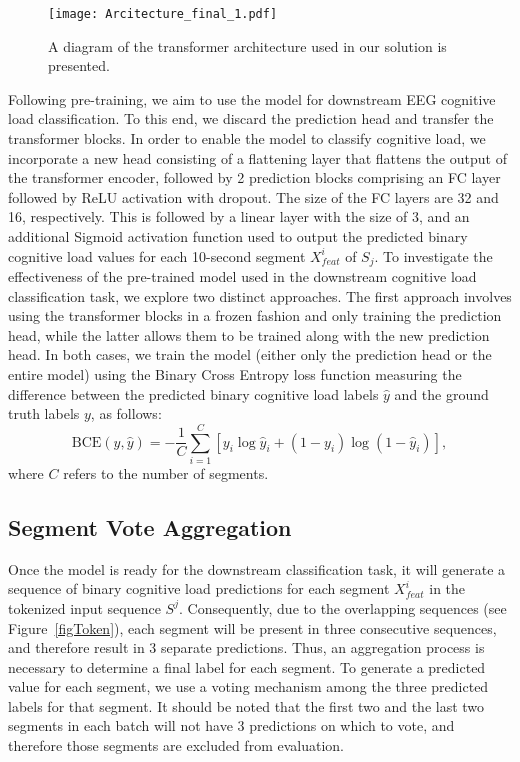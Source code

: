 \documentclass[sigconf]{acmart}
\begin{document}
\begin{figure}[t]
\centering
\texttt{[image: Arcitecture\_final\_1.pdf]}
\caption{A diagram of the transformer architecture used in our solution is presented.}
\label{figARC}
\end{figure}

Following pre-training, we aim to use the model for downstream EEG cognitive load classification. To this end, we discard the prediction head and transfer the transformer blocks. In order to enable the model to classify cognitive load, we incorporate a new head consisting of a flattening layer that flattens the output of the transformer encoder, followed by 2 prediction blocks comprising an FC layer followed by ReLU activation with dropout. The size of the FC layers are 32 and 16, respectively. This is followed by a linear layer with the size of 3, and an additional Sigmoid activation function used to output the predicted binary cognitive load values for each 10-second segment $X^{i}_{feat}$ of $S_j$. To investigate the effectiveness of the pre-trained model used in the downstream cognitive load classification task, we explore two distinct approaches. The first approach involves using the transformer blocks in a frozen fashion and only training the prediction head, while the latter allows them to be trained along with the new prediction head. In both cases, we train the model (either only the prediction head or the entire model) using the Binary Cross Entropy loss function measuring the difference between the predicted binary cognitive load labels $\hat{y}$ and the ground truth labels $y$, as follows:
\begin{equation}\label{BCE}
\mathrm{BCE}(y,\hat{y}) = -\frac{1}{C}\sum_{i=1}^{C}[y_i\log{\hat{y}_i} + (1-y_i)\log{(1-\hat{y}_i)}],
\end{equation}
where $C$ refers to the number of segments. 

\subsection{Segment Vote Aggregation}
Once the model is ready for the downstream classification task, it will generate a sequence of binary cognitive load predictions for each segment $X^{i}_{feat}$ in the tokenized input sequence $S^{j}$. Consequently, due to the overlapping sequences (see Figure~\ref{figToken}), each segment will be present in three consecutive sequences, and therefore result in 3 separate predictions. Thus, an aggregation process is necessary to determine a final label for each segment. To generate a predicted value for each segment, we use a voting mechanism among the three predicted labels for that segment. It should be noted that the first two and the last two segments in each batch will not have 3 predictions on which to vote, and therefore those segments are excluded from evaluation.
\end{document}
